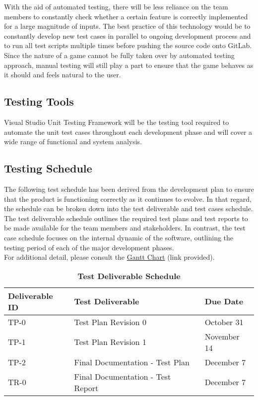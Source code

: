 \documentclass{article}
\begin{document}
\noindent
With the aid of automated testing, there will be less reliance on the team members to constantly check whether a certain feature is correctly implemented for a large magnitude of inputs. The best practice of this technology would be to constantly develop new test cases in parallel to ongoing development process and to run all test scripts multiple times before pushing the source code onto GitLab. Since the nature of a game cannot be fully taken over by automated testing approach, manual testing will still play a part to ensure that the game behaves as it should and feels natural to the user.

\subsection{Testing Tools}

Visual Studio Unit Testing Framework will be the testing tool required to automate the unit test cases throughout each development phase and will cover a wide range of functional and system analysis.

\subsection{Testing Schedule}

The following test schedule has been derived from the development plan to ensure that the product is functioning correctly as it continues to evolve. In that regard, the schedule can be broken down into the test deliverable and test cases schedule. The test deliverable schedule outlines the required test plans and test reports to be made available for the team members and stakeholders. In contrast, the test case schedule focuses on the internal dynamic of the software, outlining the testing period of each of the major development phases. \\

\noindent
For additional detail, please consult the \href{https://gitlab.cas.mcmaster.ca/yuens2/Blaze-Brigade/tree/master/Doc/DevelopmentPlan}{Gantt Chart} (link provided).

\begin{table}[h]
\caption{\textbf{Test Deliverable Schedule}}
\begin{tabularx}{\textwidth}{llX}
    \toprule
    \textbf{Deliverable ID} &\textbf{Test Deliverable} & \textbf{Due Date}\\
    \midrule
    TP-0 & Test Plan Revision 0 & October 31 \\
    TP-1 & Test Plan Revision 1 & November 14\\
    TP-2 & Final Documentation - Test Plan & December 7\\
    TR-0 & Final Documentation - Test Report & December 7 \\
    \bottomrule
\end{tabularx}
\end{table}
\end{document}
